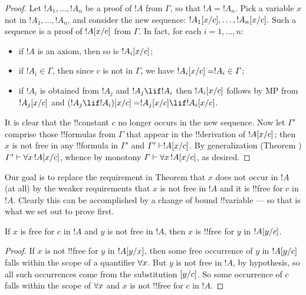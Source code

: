 \documentclass[../../include/open-logic-section]{subfiles}
\begin{document}
\begin{proof} Let $!A_1,\ldots,!A_n$ be a proof of $!A$ from $\Gamma$, so
that $!A=!A_n$. Pick a variable $x$ not in $!A_1,\ldots,!A_n$, and consider
the new sequence: $!A_1[x/c],\ldots,!A_n[x/c].$ Such a
sequence is a proof of $!A[x/c]$ from $\Gamma$. In fact, for each
$i=1,\ldots,n$: \begin{itemize} \item if $!A$ is an axiom, then so is
$!A_i[x/c]$; \item if $!A_i \in \Gamma$, then since $c$ is not in
$\Gamma$, we have $!A_i[x/c] = !A_i \in \Gamma$; \item if $!A_i$
is obtained from $!A_j$ and $!A_j \lif !A_i$ then $!A_i[x/c]$
follows by MP from $!A_j[x/c]$ and $\Subst{(!A_j \lif !A_i)}{x}{c}
= \Subst{!A_j}{x}{c} \lif \Subst{!A_i}{x}{c}$. \end{itemize} It is clear
that the !!{constant} $c$ no longer occurs in the new sequence. Now let
$\Gamma'$ comprise those !!{formula}s from $\Gamma$ that appear in the
!!{derivation} of $!A[x/c]$; then $x$ is not free in any
!!{formula} in $\Gamma'$ and $\Gamma' \Proves \Subst{!A}{x}{c}$. By
generalization (Theorem ) $\Gamma'
\Proves \lforall[x][\Subst{!A}{x}{c}]$, whence by monotony $\Gamma \Proves
\lforall[x][\Subst{!A}{x}{c}]$, as desired. 
\end{proof}

\begin{explain}
Our goal is to replace the requirement in Theorem
 that $x$ does not occur in $!A$ (at all)
by the weaker requirements that $x$ is not free in $!A$ and it is !!{free
for} $c$ in $!A$. Clearly this can be accomplished by a change of bound
!!{variable} --- so that is what we set out to prove first.
\end{explain}

\begin{lem} If $x$ is free for $c$ in $!A$ and $y$ is not
free in $!A$, then $x$ is !!{free for} $y$ in $!A[y/c]$. 
\end{lem}

\begin{proof} If $x$ is not !!{free for} $y$ in $!A[y/x]$, then
some free occurrence of $y$ in $!A[y/c]$ falls within the scope of
a quantifier $\lforall[x]$. But $y$ is not free in $!A$, by hypothesis, so
all such occurrences come from the substitution $[y/c]$. So some
occurrence of $c$ falls within the scope of $\lforall[x]$ and $x$ is not
!!{free for} $c$ in $!A$. 
\end{proof}
\end{document}
